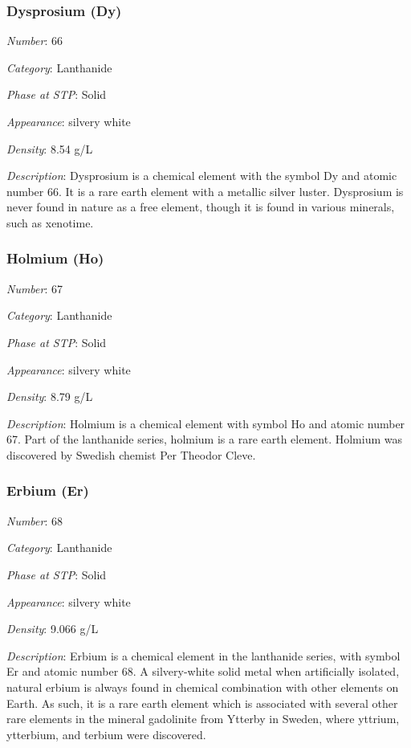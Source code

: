 \documentclass{article}
\begin{document}
\hypertarget{subsubsection::Dy}{}\subsubsection{Dysprosium (Dy)}

\textit{Number}: 66

\textit{Category}: Lanthanide

\textit{Phase at STP}: Solid

\textit{Appearance}: silvery white

\textit{Density}: 8.54 g/L

\textit{Description}: Dysprosium is a chemical element with the symbol Dy and atomic number 66. It is a rare earth element with a metallic silver luster. Dysprosium is never found in nature as a free element, though it is found in various minerals, such as xenotime.

\hypertarget{subsubsection::Ho}{}\subsubsection{Holmium (Ho)}

\textit{Number}: 67

\textit{Category}: Lanthanide

\textit{Phase at STP}: Solid

\textit{Appearance}: silvery white

\textit{Density}: 8.79 g/L

\textit{Description}: Holmium is a chemical element with symbol Ho and atomic number 67. Part of the lanthanide series, holmium is a rare earth element. Holmium was discovered by Swedish chemist Per Theodor Cleve.

\hypertarget{subsubsection::Er}{}\subsubsection{Erbium (Er)}

\textit{Number}: 68

\textit{Category}: Lanthanide

\textit{Phase at STP}: Solid

\textit{Appearance}: silvery white

\textit{Density}: 9.066 g/L

\textit{Description}: Erbium is a chemical element in the lanthanide series, with symbol Er and atomic number 68. A silvery-white solid metal when artificially isolated, natural erbium is always found in chemical combination with other elements on Earth. As such, it is a rare earth element which is associated with several other rare elements in the mineral gadolinite from Ytterby in Sweden, where yttrium, ytterbium, and terbium were discovered.
\end{document}
